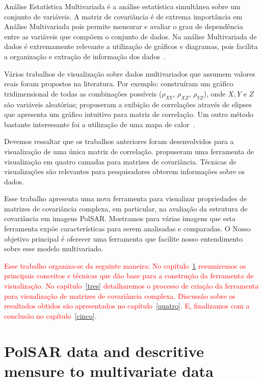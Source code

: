 \documentclass[a4paper,12pt]{article}
\begin{document}
Análise Estatística Multivariada é a análise estatística simultânea sobre um conjunto de variáveis. A matriz de covariância é de extrema importância em Análise Multivariada pois permite mensurar e avaliar o grau de dependência entre as variáveis que compõem o conjunto de dados. Na análise Multivariada de dados é extremamente relevante a utilização de gráficos e diagramas, pois facilita a organização e extração de informação dos dados~\citep{anderson-1958, Everitt-2011}.

Vários trabalhos de visualização sobre dados multivariados que assumem valores reais foram propostos na literatura. Por exemplo: \citet{Rousseeuw-1994} construíram um gráfico tridimensional de todas as combinações possíveis ($\rho_{XY}$, $\rho_{XZ}$, $\rho_{YZ}$), onde $X, Y$ e $Z$ são variáveis aleatórias; \citet{Murdoch-1996} propuseram a exibição de correlações através de elipses que apresenta um gráfico intuitivo para matriz de correlação. Um outro método bastante interessante foi a utilização de uma mapa de calor~\citep{Friendly-2002}.

Devemos ressaltar que os trabalhos anteriores foram desenvolvidos para a visualização de uma única matriz de correlação. \citet{tokuda-2011} propuseram uma ferramenta de visualização em quatro camadas para matrizes de covariância. Técnicas de visualizações são relevantes para pesquisadores obterem informações sobre os dados.

Esse trabalho apresenta uma nova ferramenta para visualizar propriedades de matrizes de covariância complexa, em particular, na avaliação da estrutura de covariância em imagens PolSAR. Mostramos para várias imagens que esta ferramenta expõe características para serem analisadas e comparadas. O Nosso objetivo principal é oferecer uma ferramenta que facilite nosso entendimento sobre esse modelo multivariado.

\textcolor{red}{Esse trabalho organiza-se da seguinte maneira: No capítulo~\ref{dois} resumiremos os principais conceitos e técnicas que dão base para a construção da ferramenta de visualização. No capítulo~\ref{tres} detalharemos o processo de criação da ferramenta para visualização de matrizes de covariância complexa. Discussão sobre os resultados obtidos são apresentados no capítulo~\ref{quatro}. E, finalizamos com a conclusão no capítulo~\ref{cinco}.}  



\section{PolSAR data and descritive mensure to multivariate data}\label{dois}
\end{document}
